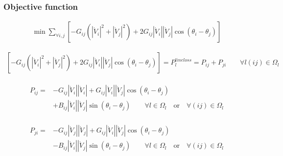 \documentclass[
	11pt, %
	aspectratio=169, %
]{beamer}
\begin{document}
\begin{frame}
	\frametitle{Objective function}
	\label{frame:objfunc}
	\begin{align}
	\label{eq:obj}
		\min{ \sum_{\forall i,j} {[-G_{ij}(\left|\dot{V}_{i} \right|^2 + \left|\dot{V}_{j} \right|^2) + 2G_{ij}\left|\dot{V}_{i} \right|\left|\dot{V}_{j} \right|\cos\left(\theta_{i}-\theta_{j} \right) ]} }
	\end{align}

	\begin{align}
	\label{eq:expr_loss}
		[-G_{ij}(\left|\dot{V}_{i} \right|^2 + \left|\dot{V}_{j} \right|^2) + 2G_{ij}\left|\dot{V}_{i} \right|\left|\dot{V}_{j} \right|\cos\left(\theta_{i}-\theta_{j} \right) ] =P_{l}^{line loss}= P_{ij} + P_{ji} \quad \quad \forall l(ij) \in \Omega_{l}
	\end{align}

	\begin{align}
	\label{eq:expr_p_flow_ij}
		\begin{split}
		P_{ij} = &-G_{ij} \left|\dot{V}_{i} \right| \left|\dot{V}_{i} \right| 
		+ G_{ij} \left|\dot{V}_{i} \right| \left|\dot{V}_{j} \right| \cos\left(\theta_{i}-\theta_{j} \right) \\
		&+ B_{ij} \left|\dot{V}_{i} \right| \left|\dot{V}_{j} \right| \sin\left(\theta_{i}-\theta_{j} \right) 
		\quad \quad \forall l \in \Omega_{l} \quad \text{or} \quad \forall (ij) \in \Omega_{l}
		\end{split}
	\end{align}

	\begin{align}
	\label{eq:expr_p_flow_ji}
		\begin{split}
		P_{ji}=&-G_{ij} \left|\dot{V}_{j} \right| \left|\dot{V}_{j} \right| 
		+ G_{ij} \left|\dot{V}_{i} \right| \left|\dot{V}_{j} \right| \cos\left(\theta_{i}-\theta_{j} \right)\\
		&- B_{ij} \left|\dot{V}_{i} \right| \left|\dot{V}_{j} \right| \sin\left(\theta_{i}-\theta_{j} \right)
		\quad \quad \forall l \in \Omega_{l} \quad \text{or} \quad \forall (ij) \in \Omega_{l}
		\end{split}
	\end{align}


\end{frame}

\end{document}
